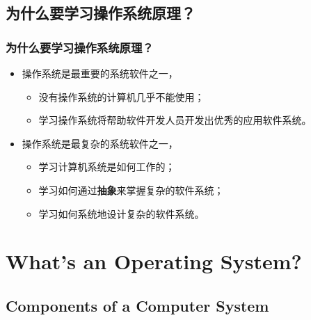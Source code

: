 \documentclass[CJKutf8,xcolor=pdftex,dvipsnames,table]{beamer}
\begin{document}
\begin{CJK*}{UTF8}{song}
\begin{frame}
\begin{itemize}
\begin{center}
	    \end{center}
	  \end{itemize}
  \end{frame}

  \subsection{为什么要学习操作系统原理？}

  \begin{frame}
    \frametitle{为什么要学习操作系统原理？} \pause
	  \begin{itemize}
	  \item{操作系统是最重要的系统软件之一，} \pause
	    \begin{itemize}
	    \item{没有操作系统的计算机几乎不能使用；} \pause
	    \item{学习操作系统将帮助软件开发人员开发出优秀的应用软件系统。} \pause
	    \end{itemize}
	  \item{操作系统是最复杂的系统软件之一，} \pause
	    \begin{itemize}
	    \item{学习计算机系统是如何工作的；} \pause
	    \item{学习如何通过\textbf{抽象}来掌握复杂的软件系统；} \pause
	    \item{学习如何系统地设计复杂的软件系统。}
	    \end{itemize}
	  \end{itemize}
  \end{frame}

  \section{What's an Operating System?}
  \subsection{Components of a Computer System}


\end{CJK*}
\end{document}
